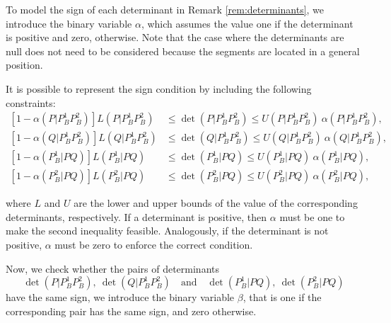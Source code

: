 \documentclass[a4paper,  review, authoryear, 1p.]{elsarticle}
\newcommand{\determinant}[3]{\det({#1|#2#3})}
\begin{document}
	\newcommand{\LS}[3]{L(#1|#2#3)}
	\newcommand{\US}[3]{U(#1|#2#3)}
	\newcommand{\alphamas}[3]{\alpha(#1|#2#3)}
	\newcommand{\alphamenos}[3]{\alpha^{-}(#1|#2#3)}
	\newcommand{\alphapunto}[3]{\alpha^{\cdotp}(#1|#2#3)}
	
	To model the sign of each determinant in Remark \ref{rem:determinants}, we introduce the binary variable $\alpha$, which assumes the value one if the determinant is positive and zero, otherwise. Note that the case where the determinants are null does not need to be considered because the segments are located in a general position.
	
	It is possible to represent the sign condition by including the following constraints:
	\begin{align*}\tag{$\alpha$-C}\label{eq:alphaC}
		\left[1-\alphamas{P}{P_B^1}{P_B^2}\right]\LS{P}{P_B^1}{P_B^2}&\leq\determinant{P}{P_B^1}{P_B^2}\leq \US{P}{P_B^1}{P_B^2}\:\alphamas{P}{P_B^1}{P_B^2},\\
		\left[1-\alphamas{Q}{P_B^1}{P_B^2}\right]\LS{Q}{P_B^1}{P_B^2}&\leq\determinant{Q}{P_B^1}{P_B^2}\leq \US{Q}{P_B^1}{P_B^2}\:\alphamas{Q}{P_B^1}{P_B^2},\\
		\left[1-\alphamas{P_B^1}{P}{Q}\right]\LS{P_B^1}{P}{Q}&\leq\determinant{P_B^1}{P}{Q}\leq \US{P_B^1}{P}{Q}\:\alphamas{P_B^1}{P}{Q},\\		\left[1-\alphamas{P_B^2}{P}{Q}\right]\LS{P_B^2}{P}{Q}&\leq\determinant{P_B^2}{P}{Q}\leq \US{P_B^2}{P}{Q}\:\alphamas{P_B^2}{P}{Q},
	\end{align*}
	
	\noindent where $L$ and $U$ are the lower and upper bounds of the value of the corresponding determinants, respectively. If a determinant is positive, then $\alpha$ must be one to make the second inequality feasible. Analogously, if the determinant is not positive, $\alpha$ must be zero to enforce the correct condition.
	
	\newcommand{\betamas}[4]{\beta(#1#2|#3#4)}
	
	Now, we check whether the pairs of determinants 
	\begin{equation}\label{eq:pair}
		\determinant{P}{P_B^1}{P_B^2},\: \determinant{Q}{P_B^1}{P_B^2}\quad \text{and} \quad \determinant{P_B^1}{P}{Q},\:	 \determinant{P_B^2}{P}{Q}
	\end{equation} 
	have the same sign, we introduce the binary variable $\beta$, that is one if the corresponding pair has the same sign, and zero otherwise.
	
\end{document}
